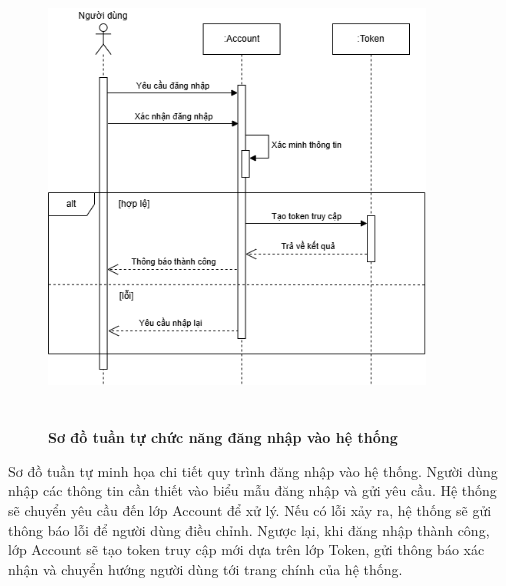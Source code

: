 \begin{figure}[H]
	\centering
	\includegraphics[width=10cm,height=12cm]{Images/sequence/user/login.drawio.png}
	\caption[Sơ đồ tuần tự chức năng đăng nhập vào hệ thống]{\bfseries \fontsize{12pt}{0pt}
		\selectfont Sơ đồ tuần tự chức năng đăng nhập vào hệ thống}
	\label{sequence_login} %
\end{figure}
Sơ đồ tuần tự minh họa chi tiết quy trình đăng nhập vào hệ thống. Người dùng nhập các thông tin cần thiết vào biểu mẫu đăng nhập và gửi yêu cầu. Hệ thống sẽ chuyển yêu cầu đến lớp Account để xử lý.
Nếu có lỗi xảy ra, hệ thống sẽ gửi thông báo lỗi để người dùng điều chỉnh. Ngược lại, khi đăng nhập thành công, lớp Account sẽ tạo token truy cập mới dựa trên lớp Token, gửi thông báo xác nhận và chuyển hướng người dùng tới trang chính của hệ thống.

